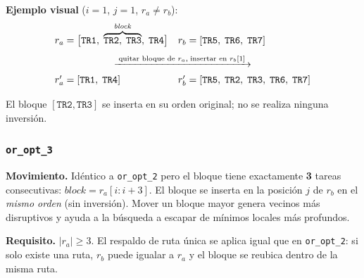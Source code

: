 \noindent\textbf{Ejemplo visual} ($i=1$, $j=1$, $r_a \neq r_b$):
\[
    \begin{array}{ll}
        r_a = \bigl[\mathtt{TR1},\;
                    \overbrace{\mathtt{TR2},\;\mathtt{TR3}}^{\mathit{block}},\;
                    \mathtt{TR4}\bigr]
        &
        r_b = [\mathtt{TR5},\;\mathtt{TR6},\;\mathtt{TR7}] \\[8pt]
        \multicolumn{2}{c}{\xrightarrow{\;\text{quitar bloque de }r_a,\;\text{insertar en }r_b[1]\;}} \\[4pt]
        r'_a = [\mathtt{TR1},\;\mathtt{TR4}]
        &
        r'_b = [\mathtt{TR5},\;\mathtt{TR2},\;\mathtt{TR3},\;\mathtt{TR6},\;\mathtt{TR7}]
    \end{array}
\]

\noindent El bloque $[\mathtt{TR2}, \mathtt{TR3}]$ se inserta en su orden
original; no se realiza ninguna inversión.

\subsubsection{\texttt{or\_opt\_3}}
\label{sssec:or-opt-3}

\textbf{Movimiento.}
Idéntico a \texttt{or\_opt\_2} pero el bloque tiene exactamente \textbf{3}
tareas consecutivas: $\mathit{block} = r_a[i{:}i{+}3]$.
El bloque se inserta en la posición $j$ de $r_b$ en el \emph{mismo orden}
(sin inversión).  Mover un bloque mayor genera vecinos más disruptivos y
ayuda a la búsqueda a escapar de mínimos locales más profundos.

\textbf{Requisito.} $|r_a| \geq 3$.  El respaldo de ruta única se aplica
igual que en \texttt{or\_opt\_2}: si solo existe una ruta, $r_b$ puede
igualar a $r_a$ y el bloque se reubica dentro de la misma ruta.

